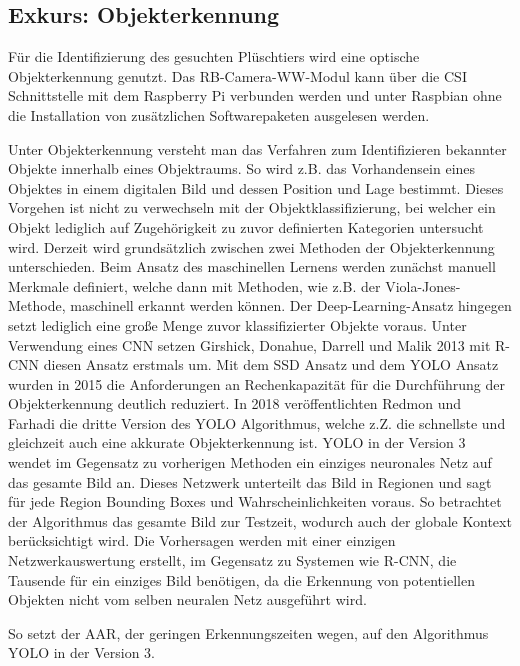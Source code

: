 \subsection{Exkurs: Objekterkennung}

Für die Identifizierung des gesuchten Plüschtiers wird eine optische Objekterkennung genutzt.
Das RB-Camera-WW-Modul kann über die \ac{CSI} Schnittstelle mit dem Raspberry Pi verbunden werden und unter Raspbian ohne die Installation von zusätzlichen Softwarepaketen ausgelesen werden.

Unter Objekterkennung versteht man das Verfahren zum Identifizieren bekannter Objekte innerhalb eines Objektraums. So wird z.B. das Vorhandensein eines Objektes in einem digitalen Bild und dessen Position und Lage bestimmt.
Dieses Vorgehen ist nicht zu verwechseln mit der Objektklassifizierung, bei welcher ein Objekt lediglich auf Zugehörigkeit zu zuvor definierten Kategorien untersucht wird.
Derzeit wird grundsätzlich zwischen zwei Methoden der Objekterkennung unterschieden.
Beim Ansatz des maschinellen Lernens werden zunächst manuell Merkmale definiert, welche dann mit Methoden, wie z.B. der Viola-Jones-Methode, maschinell erkannt werden können.
Der Deep-Learning-Ansatz hingegen setzt lediglich eine große Menge zuvor klassifizierter Objekte voraus.
Unter Verwendung eines \ac{CNN} setzen Girshick, Donahue, Darrell und Malik 2013 mit \ac{R-CNN} diesen Ansatz erstmals um.
Mit dem \ac{SSD} Ansatz und dem \ac{YOLO} Ansatz wurden in 2015 die Anforderungen an Rechenkapazität für die Durchführung der Objekterkennung deutlich reduziert.
In 2018 veröffentlichten Redmon und Farhadi die dritte Version des \ac{YOLO} Algorithmus, welche z.Z. die schnellste und gleichzeit auch eine akkurate Objekterkennung ist.
\ac{YOLO} in der Version 3 wendet im Gegensatz zu vorherigen Methoden ein einziges neuronales Netz auf das gesamte Bild an. Dieses Netzwerk unterteilt das Bild in Regionen und sagt für jede Region Bounding Boxes und Wahrscheinlichkeiten voraus.
So betrachtet der Algorithmus das gesamte Bild zur Testzeit, wodurch auch der globale Kontext berücksichtigt wird. Die Vorhersagen werden mit einer einzigen Netzwerkauswertung erstellt, im Gegensatz zu Systemen wie \ac{R-CNN}, die Tausende für ein einziges Bild benötigen, da die Erkennung von potentiellen Objekten nicht vom selben neuralen Netz ausgeführt wird.

So setzt der \ac{AAR}, der geringen Erkennungszeiten wegen, auf den Algorithmus \ac{YOLO} in der Version 3.

